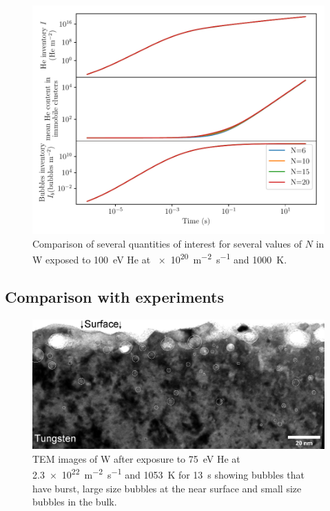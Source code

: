 \begin{figure} [h]
    \centering
    \includegraphics[width=\linewidth]{Figures/Chapter4/varying_N.pdf}
    \caption{Comparison of several quantities of interest for several values of $N$ in W exposed to \SI{100}{eV} He at \SI{e20}{m^{-2}.s^{-1}} and \SI{1000}{K}.}
    \label{fig:N variation}
\end{figure}

\subsection{Comparison with experiments}

\begin{figure} [h]
    \centering
    \includegraphics[width=\linewidth]{Figures/Chapter4/bubbles_tem.jpg}
    \caption{TEM images of W after exposure to \SI{75}{eV} He at \SI{2.3e22}{m^{-2}.s^{-1}} and \SI{1053}{K} for \SI{13}{s} showing bubbles that have burst, large size bubbles at the near surface and small size bubbles in the bulk.}
    \label{fig: tem images}
\end{figure}


